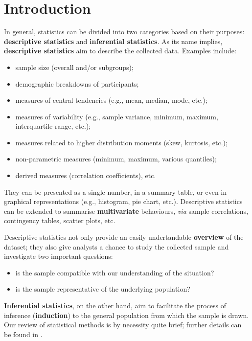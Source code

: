 \section{Introduction}

In general, statistics can be divided into two categories based on their purposes: \textbf{descriptive statistics} and \textbf{inferential statistics}. \newl As its name implies, \textbf{descriptive statistics} aim to describe the collected data. Examples include:
\begin{itemize}[noitemsep]
\item sample size (overall and/or subgroups);
\item demographic breakdowns of participants;
\item measures of central tendencies (e.g., mean, median, mode, etc.);
\item measures of variability (e.g., sample variance, minimum, maximum, interquartile range, etc.);
\item measures related to higher distribution moments (skew, kurtosis, etc.);
\item non-parametric measures (minimum, maximum, various quantiles);
\item derived measures (correlation coefficients), etc.\end{itemize}
They can be presented as a single number, in a summary table, or even in graphical representations (e.g., histogram, pie chart, etc.). Descriptive statistics can be extended to summarise \textbf{multivariate} behaviours, \textit{via} sample correlations, contingency tables, scatter plots, etc. \par
Descriptive statistics not only provide an easily undertandable \textbf{overview} of the dataset; they also give analysts a chance to study the collected sample and investigate two important questions: \begin{itemize}[noitemsep]
\item is the sample compatible with our understanding of the situation?
\item is the sample representative of the underlying population?
\end{itemize}
\textbf{Inferential statistics}, on the other hand, aim to facilitate the process of inference (\textbf{induction}) to the general population from which the sample is drawn.
\newl Our review of statistical methods is by necessity quite brief; further details can be found in \cite{SA_SA,SA_KNNL,SA_HW,SA_BB,SA_SS,SA_R,SA_Re}.  

